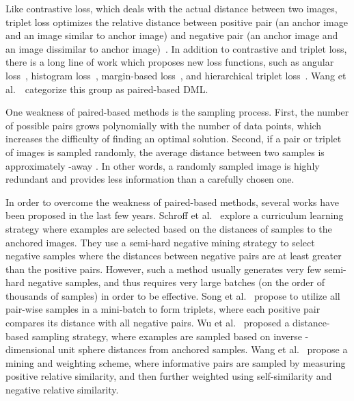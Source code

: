 \documentclass[runningheads]{llncs}
\begin{document}
Like contrastive loss, which deals with the actual distance between two images, triplet loss optimizes the relative distance between positive pair (an anchor image and an image similar to anchor image) and negative pair (an anchor image and an image dissimilar to anchor image)~\cite{Chechik:2010:LSO:1756006.1756042}. In addition to contrastive and triplet loss, there is a long line of work which proposes new loss functions, such as angular loss~\cite{Wang_2017_ICCV}, histogram loss~\cite{NIPS2016_6464}, margin-based loss~\cite{wu2017sampling}, and hierarchical triplet loss~\cite{Ge_2018_ECCV}. Wang et al.~\cite{wang2019multi}~categorize this group as paired-based DML.

One weakness of paired-based methods is the sampling process. First, the number of possible pairs grows polynomially with the number of data points, which increases the difficulty of finding an optimal solution. Second, if a pair or triplet of images is sampled randomly, the average distance between two samples is approximately -away \cite{wu2017sampling}. In other words, a randomly sampled image is highly redundant and provides less information than a carefully chosen one.

In order to overcome the weakness of paired-based methods, several works have been proposed in the last few years. Schroff et al.~\cite{Schroff_2015_CVPR} explore a curriculum learning strategy where examples are selected based on the distances of samples to the anchored images. They use a semi-hard negative mining strategy to select negative samples where the distances between negative pairs are at least greater than the positive pairs. However, such a method usually generates very few semi-hard negative samples, and thus requires very large batches (on the order of thousands of samples) in order to be effective.
Song et al.~\cite{song2016deep} propose to utilize all pair-wise samples in a mini-batch to form triplets, where each positive pair compares its distance with all negative pairs. Wu et al.~\cite{wu2017sampling} proposed a distance-based sampling strategy, where examples are sampled based on inverse -dimensional unit sphere distances from anchored samples. Wang et al.~\cite{wang2019multi} propose a mining and weighting scheme, where informative pairs are sampled by measuring positive relative similarity, and then further weighted using self-similarity and negative relative similarity.
\end{document}
